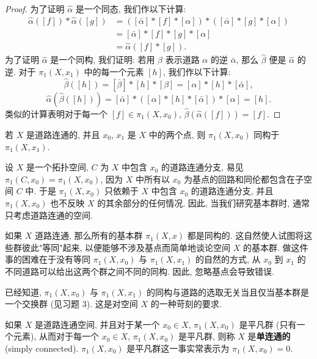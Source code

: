\begin{proof}
为了证明 $\hat{\alpha}$ 是一个同态, 我们作以下计算:
\[
\begin{aligned}
\hat{\alpha}([f])*\hat{\alpha}([g])
&=([\bar{\alpha}]*[f]*[\alpha])*([\bar{\alpha}]*[g]*[\alpha])\\
&=[\bar{\alpha}]*[f]*[g]*[\alpha]\\
&=\hat{\alpha}([f]*[g]).
\end{aligned}
\]
为了证明 $\hat{\alpha}$ 是一个同构, 我们证明: 若用 $\beta$ 表示道路 $\alpha$ 的逆 $\bar{\alpha}$, 那么 $\hat{\beta}$ 便是 $\hat{\alpha}$ 的逆. 对于 $\pi_1(X,x_1)$ 中的每一个元素 $[h]$, 我们作以下计算:
\[
\hat{\beta}([h])=[\bar{\beta}]*[h]*[\beta]=[\alpha]*[h]*[\bar{\alpha}],
\]
\[
\hat{\alpha}(\hat{\beta}([h]))=[\bar{\alpha}]*([\alpha]*[h]*[\bar{\alpha}])*[\alpha]=[h].
\]
类似的计算表明对于每一个 $[f]\in\pi_1(X,x_0)$, $\hat{\beta}(\hat{\alpha}([f]))=[f]$.
\end{proof}

\begin{corollary}
\label{corollary:ch09-sec52-52-2}
若 $X$ 是道路连通的, 并且 $x_0$, $x_1$ 是 $X$ 中的两个点, 则 $\pi_1(X,x_0)$ 同构于 $\pi_1(X,x_1)$.
\end{corollary}

设 $X$ 是一个拓扑空间, $C$ 为 $X$ 中包含 $x_0$ 的道路连通分支, 易见 $\pi_1(C,x_0)=\pi_1(X,x_0)$, 因为 $X$ 中所有以 $x_0$ 为基点的回路和同伦都包含在子空间 $C$ 中. 于是 $\pi_1(X,x_0)$ 只依赖于 $X$ 中包含 $x_0$ 的道路连通分支, 并且 $\pi_1(X,x_0)$ 也不反映 $X$ 的其余部分的任何情况. 因此, 当我们研究基本群时, 通常只考虑道路连通的空间.

如果 $X$ 道路连通, 那么所有的基本群 $\pi_1(X,x)$ 都是同构的. 这自然使人试图将这些群彼此"等同"起来, 以便能够不涉及基点而简单地谈论空间 $X$ 的基本群. 做这件事的困难在于没有等同 $\pi_1(X,x_0)$ 与 $\pi_1(X,x_1)$ 的自然的方式, 从 $x_0$ 到 $x_1$ 的不同道路可以给出这两个群之间不同的同构. 因此, 忽略基点会导致错误.

已经知道, $\pi_1(X,x_0)$ 与 $\pi_1(X,x_1)$ 的同构与道路的选取无关当且仅当基本群是一个交换群 (见习题 3). 这是对空间 $X$ 的一种苛刻的要求.

\begin{definition}[单连通]
\label{definition:ch09-sec52-simply-connected}
如果 $X$ 是道路连通空间, 并且对于某一个 $x_0\in X$, $\pi_1(X,x_0)$ 是平凡群 (只有一个元素), 从而对于每一个 $x_0\in X$, $\pi_1(X,x_0)$ 是平凡群, 则称 $X$ 是\textbf{单连通的}(simply connected). $\pi_1(X,x_0)$ 是平凡群这一事实常表示为 $\pi_1(X,x_0)=0$.
\end{definition}

